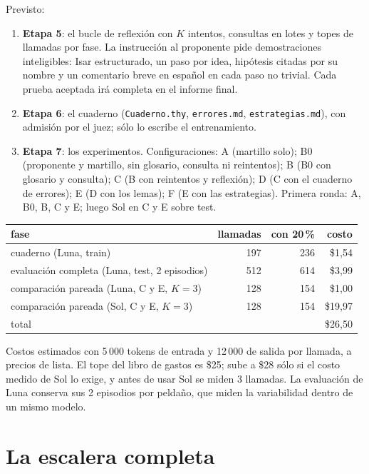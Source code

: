 \documentclass[11pt,a4paper]{article}
\begin{document}
Previsto:
\begin{enumerate}
  \item \textbf{Etapa 5}: el bucle de reflexión con $K$ intentos, consultas en lotes y topes de llamadas por fase. La instrucción al proponente pide demostraciones inteligibles: Isar estructurado, un paso por idea, hipótesis citadas por su nombre y un comentario breve en español en cada paso no trivial. Cada prueba aceptada irá completa en el informe final.
  \item \textbf{Etapa 6}: el cuaderno (\texttt{Cuaderno.thy}, \texttt{errores.md}, \texttt{estrategias.md}), con admisión por el juez; sólo lo escribe el entrenamiento.
  \item \textbf{Etapa 7}: los experimentos. Configuraciones: A (martillo solo); B0 (proponente y martillo, sin glosario, consulta ni reintentos); B (B0 con glosario y consulta); C (B con reintentos y reflexión); D (C con el cuaderno de errores); E (D con los lemas); F (E con las estrategias). Primera ronda: A, B0, B, C y E; luego Sol en C y E sobre test.
\end{enumerate}

\begin{center}
\footnotesize
\begin{tabular}{@{}lrrr@{}}
\toprule
fase & llamadas & con 20\,\% & costo \\
\midrule
cuaderno (Luna, train) & 197 & 236 & \$1{,}54 \\
evaluación completa (Luna, test, 2 episodios) & 512 & 614 & \$3{,}99 \\
comparación pareada (Luna, C y E, $K = 3$) & 128 & 154 & \$1{,}00 \\
comparación pareada (Sol, C y E, $K = 3$) & 128 & 154 & \$19{,}97 \\
\midrule
total & & & \$26{,}50 \\
\bottomrule
\end{tabular}
\end{center}
Costos estimados con 5\,000 tokens de entrada y 12\,000 de salida por llamada, a precios de lista. El tope del libro de gastos es \$25; sube a \$28 sólo si el costo medido de Sol lo exige, y antes de usar Sol se miden 3 llamadas. La evaluación de Luna conserva sus 2 episodios por peldaño, que miden la variabilidad dentro de un mismo modelo.



\appendix
\section{La escalera completa}\label{ap:escalera}
\end{document}
